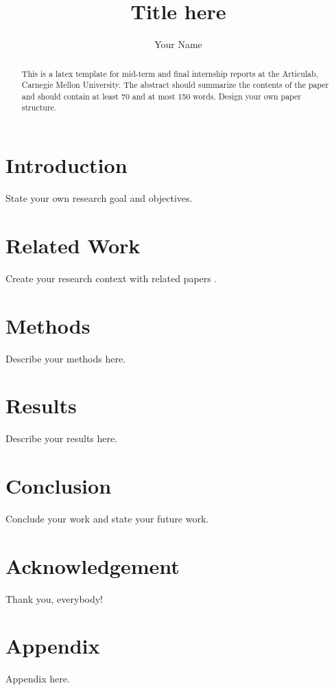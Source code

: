 \documentclass[runningheads,a4paper]{llncs}
\begin{document}
\title{Title here}

\author{Your Name}

\maketitle

\begin{abstract}
This is a latex template for mid-term and final internship reports at the Articulab,
Carnegie Mellon University.
The abstract should summarize the contents of the paper and should
contain at least 70 and at most 150 words. Design your own paper structure.
\end{abstract}

\section{Introduction}
State your own research goal and objectives.

\section{Related Work}
Create your research context with related papers
\cite{cassell2000embodied}.

\section{Methods}
Describe your methods here.

\section{Results}
Describe your results here.

\section{Conclusion}
Conclude your work and state your future work.

\section{Acknowledgement}
Thank you, everybody!




\section{Appendix}
Appendix here.
\end{document}
